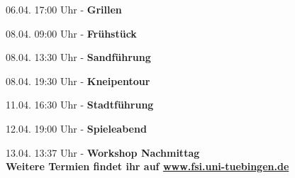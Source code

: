 \large 06.04. 17:00 Uhr - \textbf{Grillen}\\
\normalsize

\large 08.04. 09:00 Uhr - \textbf{Frühstück}\\
\normalsize

\large 08.04. 13:30 Uhr - \textbf{Sandführung}\\
\normalsize

\large 08.04. 19:30 Uhr - \textbf{Kneipentour}\\
\normalsize

\large 11.04. 16:30 Uhr - \textbf{Stadtführung}\\
\normalsize

\large 12.04. 19:00 Uhr - \textbf{Spieleabend}\\
\normalsize

\large 13.04. 13:37 Uhr - \textbf{Workshop Nachmittag}\\
\normalsize
\vfill
\centering \large \textbf{Weitere Termien findet ihr auf \url{www.fsi.uni-tuebingen.de}}

%			
